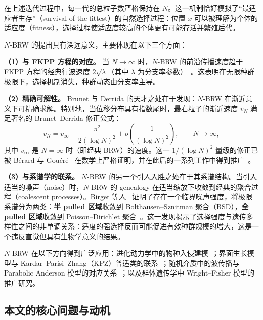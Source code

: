 在上述迭代过程中，每一代的总粒子数严格保持在 $N$。这一机制恰好模拟了``最适应者生存''（survival of the fittest）的自然选择过程：位置 $x$ 可以被理解为个体的适应度（fitness），选择过程使适应度较高的个体更有可能存活并繁殖后代。

$N$-BRW 的提出具有深远意义，主要体现在以下三个方面：

\medskip
\noindent
\textbf{（1）与 FKPP 方程的对应。}
当 $N\to\infty$ 时，$N$-BRW 的前沿传播速度趋于 FKPP 方程的经典行波速度 $2\sqrt{\lambda}$（其中 $\lambda$ 为分支率参数）~\cite{brunet2006,brassil2020}。这表明在无限种群极限下，选择机制消失，种群动态由分支率主导。

\medskip
\noindent
\textbf{（2）精确可解性。}
Brunet 与 Derrida 的天才之处在于发现：$N$-BRW 在渐近意义下可精确求解。特别地，当位移分布具有指数尾时，最右粒子的渐近速度 $v_N$ 满足著名的 Brunet--Derrida 修正公式：
\begin{equation}
\label{eq:brunet_derrida_formula}
v_N = v_\infty - \frac{\pi^2}{2(\log N)^2} + o\!\left(\frac{1}{(\log N)^2}\right),
\qquad N\to\infty,
\end{equation}
其中 $v_\infty$ 是 $N=\infty$ 时（即经典 BRW）的速度。这一 $1/(\log N)^2$ 量级的修正已被 Bérard 与 Gouéré~\cite{berard2010} 在数学上严格证明，并在此后的一系列工作中得到推广~\cite{berard2014,berard2017}。

\medskip
\noindent
\textbf{（3）与系谱学的联系。}
$N$-BRW 的另一个引人入胜之处在于其系谱结构。当引入适当的噪声（noise）时，$N$-BRW 的 genealogy 在适当缩放下收敛到经典的聚合过程（coalescent processes）。Birget 等人~\cite{birget2023} 证明了存在一个临界噪声强度，将极限系谱分为两类：\textbf{半 pulled 区域}收敛到 Bolthausen--Sznitman 聚合（BSD），\textbf{全 pulled 区域}收敛到 Poisson--Dirichlet 聚合~\cite{bolthausen1998,pitman1999}。这一发现揭示了选择强度与遗传多样性之间的非单调关系：适度的强选择反而可能促进有效种群规模的增大，这是一个违反直觉但具有生物学意义的结果。

$N$-BRW 在以下方向得到广泛应用：进化动力学中的物种入侵建模~\cite{pezzuto2022}；界面生长模型与 Kardar--Parisi--Zhang（KPZ）普适类的联系~\cite{kardar1986}；随机介质中的波传播与 Parabolic Anderson 模型的对应关系~\cite{caravenna2009}；以及群体遗传学中 Wright--Fisher 模型的推广研究。

\subsection{本文的核心问题与动机}
\label{ssec:research_question}

